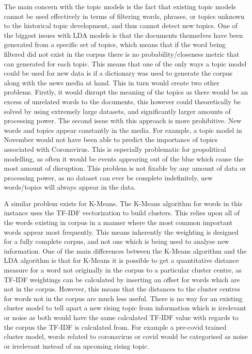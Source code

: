 The main concern with the topic models is the fact that existing topic models cannot be used effectively in terms of filtering words, phrases, or topics unknown to the historical topic development, and thus cannot detect new topics. One of the biggest issues with LDA models is that the documents themselves have been generated from a specific set of topics, which means that if the word being filtered did not exist in the corpus there is no probability/closeness metric that can generated for each topic. This means that one of the only ways a topic model could be used for new data is if a dictionary was used to generate the corpus along with the news media at hand. This in turn would create two other problems. Firstly, it would disrupt the meaning of the topics as there would be an excess of unrelated words to the documents, this however could theoretically be solved by using extremely large datasets, and significantly larger amounts of processing power. The second issue with this approach is more prohibitive. New words and topics appear constantly in the media. For example, a topic model in November would not have been able to predict the importance of topics associated with Coronavirus. This is especially problematic for geopolitical modelling, as often it would be events appearing out of the blue which cause the most amount of disruption. This problem is not fixable by any amount of data or processing power, as no dataset can ever be complete indefinitely, new words/topics will always appear in the data.  

A similar problem exists for K-Means. The K-Means algorithm for words in this instance uses the TF-IDF vectorization to build clusters. This relies upon all of the words existing in corpus in a manner where the most common important words appear most frequently. This means inherently the weighting is designed for a fully complete corpus, and not one which is being used to analyse new information. One of the main differences between the K-Means algorithm and the LDA algorithm is that for K-Means it is possible to get a quantitative distance measure for a word not originally in the corpus to a particular cluster centre, as TF-IDF weightings can be calculated by inserting an offset for words which are not in the corpus. However, this means that the distances to the cluster centres for words not in the corpus are much less useful. There is no way for an existing cluster model to tell apart a new rising topic from information which is irrelevant or noise as both would have the same calculated TF-IDF value with regards to the corpus the TF-IDF is calculated from. For example a pre-covid trained cluster model, words related to coronavirus or covid would be categorised as noise or irrelevant instead of an upcoming rising topic.

